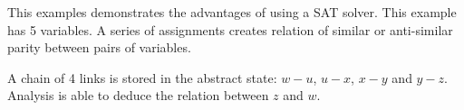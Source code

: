 This examples demonstrates the advantages of using a SAT solver. This
example has 5 variables. A series of assignments creates relation of
similar or anti-similar parity between pairs of variables.

A chain of 4 links is stored in the abstract state: $w-u$, $u-x$, $x-y$
and $y-z$. Analysis is able to deduce the relation between $z$ and $w$.
